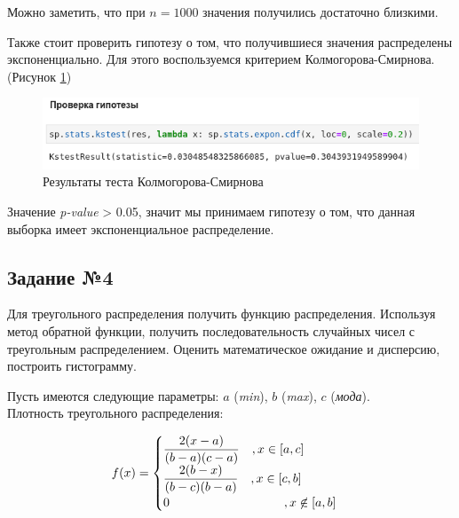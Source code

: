 \documentclass[14pt,fleqn]{extarticle}
\begin{document}
	Можно заметить, что при $n = 1000$ значения получились достаточно близкими.

	\newpage
   	Также стоит проверить гипотезу о том, что получившиеся значения распределены экспоненциально. Для этого воспользуемся критерием Колмогорова-Смирнова. (Рисунок \ref{fig:exp_inverse_function_method_test})
	\begin{figure}[h]
		\centering \includegraphics[scale=0.6]{exp_inverse_function_method_test}
		\caption{Результаты теста Колмогорова-Смирнова}
		\label{fig:exp_inverse_function_method_test}
	\end{figure}
	
	Значение \textit{p-value} > 0.05, значит мы принимаем гипотезу о том, что данная выборка имеет экспоненциальное распределение.
	
	\subsection*{Задание №4}
	Для треугольного распределения получить функцию распределения. Используя метод обратной функции, получить последовательность случайных чисел с треугольным распределением. Оценить математическое ожидание и дисперсию, построить гистограмму.\\
	\newline
	
	Пусть имеются следующие параметры: $a$ (\textit{min}), $b$ (\textit{max}), $c$ (\textit{мода}).\\
    Плотность треугольного распределения:
    \begin{ceqn}
	\begin{align*}
		f(x) =
		\begin{cases}
			\dfrac{2(x-a)}{(b-a)(c-a)} \quad , x \in [a,c]\\
			\dfrac{2(b-x)}{(b-c)(b-a)} \quad , x \in [c,b]\\
			0 \hspace{3.25cm} , x \centernot\in [a,b]\\
		\end{cases}
	\end{align*}
    \end{ceqn}
\end{document}
